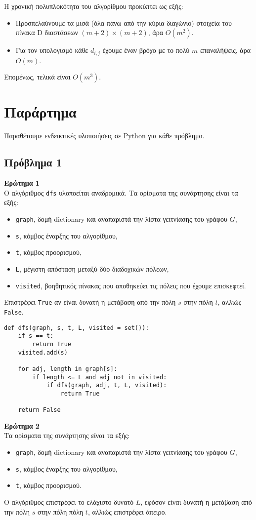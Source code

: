 \documentclass[12pt]{article}
\begin{document}
\bigskip
Η χρονική πολυπλοκότητα του αλγορίθμου προκύπτει ως εξής: 
\begin{itemize}
    \item Προσπελαύνουμε τα μισά (όλα πάνω από την κύρια διαγώνιο) στοιχεία του πίνακα D διαστάσεων \((m+2)\times (m+2)\), άρα \(O(m^2)\).
    \item Για τον υπολογισμό κάθε \(d_{i,j}\) έχουμε έναν βρόχο με το πολύ \(m\) επαναλήψεις, άρα \(O(m)\).
\end{itemize}
Επομένως, τελικά είναι \(O(m^3)\). \hfill \blacksquare

\newpage
\section*{Παράρτημα}
Παραθέτουμε ενδεικτικές υλοποιήσεις σε Python για κάθε πρόβλημα. 
\subsection*{Πρόβλημα 1}
\textbf{Ερώτημα 1} \\
Ο αλγόριθμος \texttt{dfs} υλοποείται αναδρομικά. 
Τα ορίσματα της συνάρτησης  είναι τα εξής:
\begin{itemize}
    \item \texttt{graph}, δομή dictionary και αναπαριστά την λίστα γειτνίασης του γράφου $G$,
    \item \texttt{s}, κόμβος έναρξης του αλγορίθμου, 
    \item \texttt{t}, κόμβος προορισμού, 
    \item \texttt{L}, μέγιστη απόσταση μεταξύ δύο διαδοχικών πόλεων, 
    \item \texttt{visited}, βοηθητικός πίνακας που αποθηκεύει τις πόλεις που έχουμε επισκεφτεί.
\end{itemize}
Επιστρέφει \texttt{True} αν είναι δυνατή η μετάβαση από την πόλη $s$ στην πόλη $t$, αλλιώς \texttt{False}. 

\begin{verbatim}
def dfs(graph, s, t, L, visited = set()):
    if s == t:
        return True
    visited.add(s)
    
    for adj, length in graph[s]:
        if length <= L and adj not in visited:
            if dfs(graph, adj, t, L, visited):
                return True
    
    return False
\end{verbatim}

\newpage
\textbf{Ερώτημα 2}\\
Τα ορίσματα της συνάρτησης είναι τα εξής:
\begin{itemize}
    \item \texttt{graph}, δομή dictionary και αναπαριστά την λίστα γειτνίασης του γράφου $G$,
    \item \texttt{s}, κόμβος έναρξης του αλγορίθμου, 
    \item \texttt{t}, κόμβος προορισμού.
\end{itemize}
O αλγόριθμος επιστρέφει το ελάχιστο δυνατό $L$, εφόσον είναι δυνατή η μετάβαση από την πόλη $s$ στην πόλη πόλη $t$, αλλιώς επιστρέφει άπειρο. 
\end{document}
